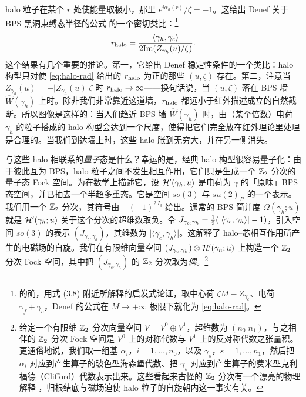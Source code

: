 halo 粒子在某个 $r$ 处使能量取极小，那里 $e^{i\alpha_h(r)} / \zeta = -1$。这给出 Denef 关于 BPS 黑洞束缚态半径的公式 \cite{Denef:2000nb} 的一个密切类比：\footnote{的确，用式 (3.8)%
附近所解释的启发式论证，取中心荷 $\zeta M - Z_{\gamma_c}$、电荷 $\gamma_f + \gamma_c$，Denef 的公式在 $M\to +\infty$ 极限下就化为 \eqref{eq:halo-rad}。}
\begin{equation}\label{eq:halo-rad}
r_{\rm halo} = \frac{\langle \gamma_h, \gamma_c\rangle}{2 {\rm
Im}(Z_{\gamma_h}(u)/\zeta)}.
\end{equation}
这个结果有几个重要的推论。第一，它给出 Denef 稳定性条件的一个类比：halo 构型只对使 \eqref{eq:halo-rad} 给出的 $r_{\rm halo}$ 为正的那些 $(u,\zeta)$ 存在。第二，注意当 $Z_{\gamma_h}(u) = - \vert Z_{\gamma_h}(u)\vert \zeta$ 时 $r_{\rm halo} \to \infty$——换句话说，当 $(u, \zeta)$ 落在 BPS 墙 $\widehat W(\gamma_h)$ 上时。除非我们非常靠近这道墙，$r_{\rm halo}$ 都远小于红外描述成立的自然截断。所以图像是这样的：当人们趋近 BPS 墙 $\widehat W(\gamma_h)$ 时，由（某个倍数）电荷 $\gamma_h$ 的粒子搭成的 halo 构型会达到一个尺度，使得把它们完全放在红外理论里处理是合理的。当我们到达墙上时，这些 halo 胀到无穷大，并在另一侧消失。

与这些 halo 相联系的\emph{量子}态是什么？幸运的是，经典 halo 构型很容易量子化：由于彼此互为 BPS，halo 粒子之间不发生相互作用，它们只是生成一个 $\mathbb{Z}_2$ 分次的量子态 Fock 空间。为在数学上描述它，设 $\mathcal{H}'(\gamma_h;u)$ 是电荷为 $\gamma$ 的「原味」BPS 态空间，并已抽去一个半超多重态。它是空间 $so(3)$ 与 $su(2)_R$ 的一个表示。我们用一个 $\mathbb{Z}_2$ 分次，其符号由 $-(-1)^{2J_3}$ 给出。通常的 BPS 简并度 $\Omega(\gamma_h;u)$ 就是 $\mathcal{H}'(\gamma_h;u)$ 关于这个分次的超维数取负。令 $J_{\gamma_c,\gamma_h}= \tfrac{1}{2} (\vert \langle \gamma_c, \gamma_h\rangle \vert-1)$，引入空间 $so(3)$ 的表示 $(J_{\gamma_c,\gamma_h})$，其维数为 $\vert \langle \gamma_c, \gamma_h\rangle \vert$。这解释了 halo–芯相互作用所产生的电磁场的自旋。我们在有限维向量空间 $(J_{\gamma_c,\gamma_h})\otimes \mathcal{H}'(\gamma_h;u)$ 上构造一个 $\mathbb{Z}_2$ 分次 Fock 空间，其中把 $(J_{\gamma_c,\gamma_h})$ 的 $\mathbb{Z}_2$ 分次取为\emph{偶}。\footnote{给定一个有限维 $\mathbb{Z}_2$ 分次向量空间 $V= V^0 \oplus V^1$，超维数为 $(n_0\vert n_1)$，与之相伴的 $\mathbb{Z}_2$ 分次 Fock 空间是 $V^0$ 上的对称代数与 $V^1$ 上的反对称代数之张量积。更通俗地说，我们取一组基 $\alpha_i$，$i=1,\dots, n_0$，以及 $\gamma_s$，$s=1, \dots, n_1$，然后把 $\alpha_i$ 对应到产生算子的玻色型海森堡代数、把 $\gamma_s$ 对应到产生算子的费米型克利福德（Clifford）代数表示出来。这些看起来古怪的 $\mathbb{Z}_2$ 分次有一个漂亮的物理解释 \cite{Denef:2002ru}，归根结底与磁场迫使 halo 粒子的自旋朝内这一事实有关。}

